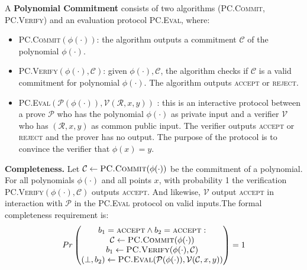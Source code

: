\begin{definition}
A \textbf{Polynomial Commitment} consists of two algorithms (\textsc{PC.Commit}, \textsc{PC.Verify}) and an evaluation protocol \textsc{PC.Eval}, where:

\begin{itemize}
    \item \textsc{PC.Commit}$(\phi(\cdot))$: the algorithm outputs a commitment $\mathcal{C}$ of the polynomial $\phi(\cdot)$.
    
    \item \textsc{PC.Verify}$(\phi(\cdot), \mathcal{C})$: given $\phi(\cdot), \mathcal{C}$, the algorithm checks if $\mathcal{C}$ is a valid commitment for polynomial $\phi(\cdot)$. The algorithm outputs \textsc{accept} or \textsc{reject}.
    
    \item \textsc{PC.Eval}$(\mathcal{P}(\phi(\cdot)), \mathcal{V}(\mathcal{R}, x, y))$ : this is an  interactive protocol between a prove $\mathcal{P}$ who has the polynomial $\phi(\cdot)$ as private input and a verifier $\mathcal{V}$ who has $(\mathcal{R}, x, y)$ as common public input. The verifier outputs \textsc{accept} or \textsc{reject} and the prover has no output. The purpose of the protocol is to convince the verifier that $\phi(x) = y$.
\end{itemize}

\end{definition}

\textbf{Completeness.} Let $\mathcal{C} \leftarrow \textsc{PC.Commit}(\phi(\cdot))$ be the commitment of a polynomial. 
For all polynomials $\phi(\cdot)$ and all points $x$, with probability 1 the verification \textsc{PC.Verify}$(\phi(\cdot), \mathcal{C})$ outputs \textsc{accept}. And likewise, $\mathcal{V}$ output \textsc{accept} in interaction with $\mathcal{P}$ in the \textsc{PC.Eval} protocol on valid inputs.The formal completeness requirement is:
$$
Pr
\begin{pmatrix}
 b_1 = \textsc{accept} \wedge b_2 = \textsc{accept}: \\
 \mathcal{C} \leftarrow \textsc{PC.Commit}(\phi(\cdot)) \\
 b_1 \leftarrow \textsc{PC.Verify}(\phi(\cdot), \mathcal{C}) \\
 (\perp, b_2)\leftarrow \textsc{PC.Eval}(\mathcal{P}(\phi(\cdot)), \mathcal{V}(\mathcal{C}, x, y))
\end{pmatrix}
= 1
$$



